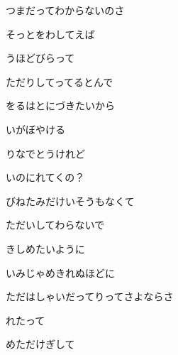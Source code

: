 \documentclass[a4paper,tate,twocolumn,12pt]{ltjtarticle}
\begin{document}
\thispagestyle{empty}

\begin{center}
{\LARGE {}}
\end{center}

\vspace{1em}

\begin{flushleft}

\noindent\begin{minipage}{\linewidth}
つまだってわからないのさ

そっとをわしてえば

うほどびらって

ただりしてってるとんで

をるはとにづきたいから
\end{minipage}

\vspace{2em}

\noindent\begin{minipage}{\linewidth}
いがぼやける

りなでとうけれど

いのにれてくの？

びねたみだけいそうもなくて
\end{minipage}

\vspace{2em}

\noindent\begin{minipage}{\linewidth}
ただいしてわらないで

きしめたいように

いみじゃめきれぬほどに

ただはしゃいだってりってさよならさ

れたって

めただけぎして


\end{minipage}
\end{flushleft}
\end{document}
